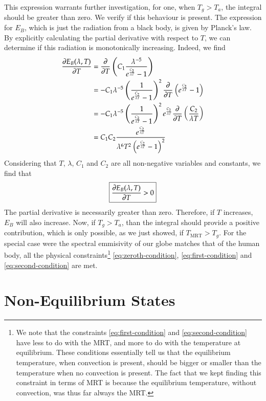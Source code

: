 \documentclass[]{scrartcl}
\begin{document}
This expression warrants further investigation, for one, when $T_g > T_a$, the integral should be greater than zero. We verify if this behaviour is present. The expression for $E_B$, which is just the radiation from a black body, is given by Planck's law. By explicitly calculating the partial derivative with respect to $T$, we can determine if this radiation is monotonically increasing. Indeed, we find
\begin{equation}
\begin{split}
	\diffp{E_B(\lambda, T)}{T} &= \diffp{}{T}\left(C_1 \frac{\lambda^{-5}}{e^{\frac{C_2}{\lambda T}} - 1}\right)
	\\
	&= -C_1\lambda^{-5}\left(\frac{1}{e^{\frac{C_2}{\lambda T}} - 1}\right)^2\diffp{}{T}\left(e^{\frac{C_2}{\lambda T}} - 1\right)
	\\
	&=-C_1\lambda^{-5}\left(\frac{1}{e^{\frac{C_2}{\lambda T}} - 1}\right)^2e^{\frac{C_2}{\lambda T}} \diffp{}{T}\left(\frac{C_2}{\lambda T}\right)
	\\
	&=C_1C_2\frac{e^{\frac{C_2}{\lambda T}}}{\lambda^6T^2\left(e^{\frac{C_2}{\lambda T}} - 1\right)^2}
\end{split}
\end{equation}
Considering that $T$, $\lambda$, $C_1$ and $C_2$ are all non-negative variables and constants, we find that
\begin{equation}
	\boxed{\diffp{E_B(\lambda, T)}{T} > 0}
\end{equation}
The partial derivative is necessarily greater than zero. Therefore, if $T$ increases, $E_B$ will also increase. Now, if $T_g > T_a$, than the integral should provide a positive contribution, which is only possible, as we just showed, if $T_{\text{MRT}}>T_g$. For the special case were the spectral emmisivity of our globe matches that of the human body, all the physical constraints\footnote{We note that the constraints \eqref{eq:first-condition} and \eqref{eq:second-condition} have less to do with the MRT, and more to do with the temperature at equilibrium. These conditions essentially tell us that the equilibrium temperature, when convection is present, should be bigger or smaller than the temperature when no convection is present. The fact that we kept finding this constraint in terms of MRT is because the equilibrium temperature, without convection, was thus far always the MRT.} \eqref{eq:zeroth-condition}, \eqref{eq:first-condition} and \eqref{eq:second-condition} are met.


\section{Non-Equilibrium States}
\end{document}
